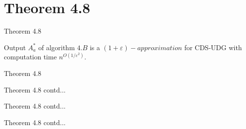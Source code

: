 \documentclass{beamer}
\begin{document}
\section{Theorem 4.8}


\begin{frame}

    \begin{block}{Theorem 4.8}

        Output $A_a^*$ of algorithm $4.B$ is a $(1 + \varepsilon)-approximation$ for CDS-UDG with computation time $ n^{O(1/{\varepsilon^2})} $.
        
    \end{block}
    
\end{frame}

\begin{frame}{Theorem 4.8}

    
    
\end{frame}

\begin{frame}{Theorem 4.8 contd...}

    
    
\end{frame}

\begin{frame}{Theorem 4.8 contd...}

    
    
\end{frame}

\begin{frame}{Theorem 4.8 contd...}

    
    
\end{frame}
\end{document}
